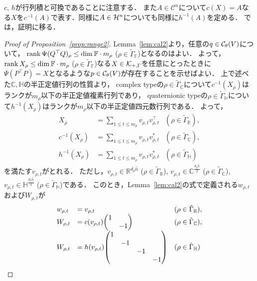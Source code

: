 \documentclass[11pt]{article}
\theoremstyle{definition}
\begin{document}
    $c$, $h$が行列積と可換であることに注意する．
    また$A \in \mathcal{C}^n$について$c(X)=A$なる$X$を$c^{-1}(A)$で表す．同様に$A \in {\cal H}^n$についても同様に$h^{-1}(A)$を定める．
    では，証明に移る．
    \begin{proof}[Proof of Proposition~\ref{prop:range2}]
        Lemma~\ref{lem:cal2}より，任意の$q \in {\cal C}_\theta(V)$について，
        $\rank \Psi(Q^\top Q)_\rho \leq \dim \mathbb{F}\cdot m_\rho$ ($\rho \in \tilde{\Gamma}_\mathbb{F}$)となるのはよい．
        よって，$\rank X_\rho \leq \dim \mathbb{F}\cdot m_\rho$ ($\rho \in \tilde{\Gamma}_\mathbb{F}$)なる$X \in {\cal K}_{+,\Gamma}$を任意にとったときに
        $\Psi(P^\top P)=X$となるような$p \in {\cal C}_\theta(V)$が存在することを示せばよい．
        上で述べた$\mathbb{C}, \mathbb{H}$の半正定値行列の性質より，
        complex typeの$\rho \in \tilde{\Gamma}_\mathbb{C}$について$c^{-1}(X_\rho)$はランクが$m_\rho$以下の半正定値複素行列であり，
        quaternionic typeの$\rho \in \tilde{\Gamma}_\mathbb{H}$について$h^{-1}(X_\rho)$はランクが$m_\rho$以下の半正定値四元数行列である．
        よって，
        \[
        \begin{array} {lll}
            X_\rho&=\sum_{1 \leq t \leq m_\rho} v_{\rho,t} v_{\rho,t}^\top & (\rho \in \tilde{\Gamma}_\mathbb{R}), \\
            c^{-1}(X_\rho)&=\sum_{1 \leq t \leq m_\rho} v_{\rho,t} v_{\rho,t}^* & (\rho \in \tilde{\Gamma}_\mathbb{C}), \\
            h^{-1}(X_\rho)&=\sum_{1 \leq t \leq m_\rho} v_{\rho,t} v_{\rho,t}^* & (\rho \in \tilde{\Gamma}_\mathbb{H})
        \end{array}
        \]
        を満たす$v_{\rho,t}$がとれる．
        ただし，$v_{\rho,t} \in \mathbb{R}^{d_\rho \hat{n}}$ ($\rho \in \tilde{\Gamma}_\mathbb{R}$), 
        $v_{\rho,t} \in \mathbb{C}^\frac{d_\rho \hat{n}}{2}$ ($\rho \in \tilde{\Gamma}_\mathbb{C}$), 
        $v_{\rho,t} \in \mathbb{H}^\frac{d_\rho \hat{n}}{4}$ ($\rho \in \tilde{\Gamma}_\mathbb{H}$)である．
        このとき，Lemma~\ref{lem:cal2}の式で定義される$w_{\rho,t}$および$W_{\rho,t}$が
        \[
        \begin{array}{lll}
            w_{\rho,t} &= v_{\rho,t}  &(\rho \in \tilde{\Gamma}_\mathbb{R}), \\
            W_{\rho,t} &= c(v_{\rho,t}) \mqty(\dmat{1,-1}) &(\rho \in \tilde{\Gamma}_\mathbb{C}), \\
            W_{\rho,t} &= h(v_{\rho,t}) \mqty(\dmat{1,-1,-1,-1}) &(\rho \in \tilde{\Gamma}_\mathbb{H})
        \end{array}
\]
\end{proof}
\end{document}
